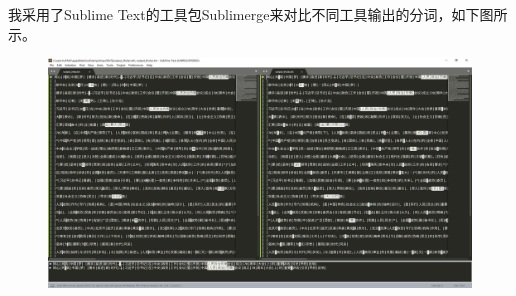 \documentclass[logo,reportComp]{thesis}
\begin{document}
我采用了Sublime Text的工具包Sublimerge来对比不同工具输出的分词，如下图所示。
\begin{figure}[H]
\centering
\includegraphics[width=\linewidth]{compare.png}
\end{figure}
\end{document}
